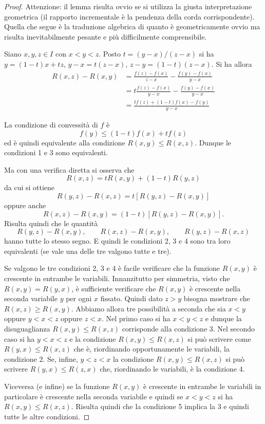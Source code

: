 \begin{proof}
Attenzione:
il lemma risulta ovvio se si utilizza la giusta interpretazione geometrica
(il rapporto incrementale è la pendenza della corda corrispondente).
Quella che segue è la traduzione algebrica di quanto
è geometricamente ovvio ma risulta inevitabilmente pesante
e più difficilmente comprensibile.

Siano $x,y,z\in I$ con $x<y<z$.
Posto $t=(y-x)/(z-x)$ si ha $y=(1-t)x + tz$,
 $y-x = t(z-x)$, $z-y = (1-t)(z-x)$.
Si ha allora
 \begin{equation*}
 \begin{aligned}
 R(x,z) - R(x,y)
 &= \frac{f(z)-f(x)}{z-x} - \frac{f(y)-f(x)}{y-x} \\
  &= t\frac{f(z)-f(x)}{y-x} - \frac{f(y)-f(x)}{y-x} \\
  &= \frac{tf(z) + (1-t) f(x) - f(y)}{y-x}
 \end{aligned}
 \end{equation*}

La condizione di convessità di $f$ è
\[
  f(y) \le (1-t)f(x) + tf(z)
\]
ed è quindi equivalente alla condizione $R(x,y) \le R(x,z)$.
Dunque le condizioni 1 e 3 sono equivalenti.

Ma con una verifica diretta si osserva che
\[
  R(x,z) = t R(x,y) + (1-t) R(y,z)
\]
da cui si ottiene
\[
  R(y,z) - R(x,z) = t[R(y,z) - R(x,y)]
\]
oppure anche
\[
 R(x,z) - R(x,y) = (1-t) [R(y,z) - R(x,y)].
\]
Risulta quindi che le quantità
\[
  R(y,z) - R(x,y), \qquad
  R(x,z) - R(x,y), \qquad
  R(y,z) - R(x,z)
\]
hanno tutte lo stesso segno. E quindi le condizioni 2, 3 e 4 sono tra loro equivalenti (se vale una delle tre valgono tutte e tre).

Se valgono le tre condizioni 2, 3 e 4 è facile verificare che la funzione $R(x,y)$ è crescente in entrambe le variabili. Innanzitutto per simmetria, visto che $R(x,y) = R(y,x)$, è sufficiente verificare che $R(x,y)$ è crescente nella seconda variabile $y$ per ogni $x$ fissato. Quindi dato $z>y$ bisogna mostrare che $R(x,z) \ge R(x,y)$.
Abbiamo allora tre possibilità a seconda che sia $x<y$ oppure $y<x<z$ oppure $z<x$. Nel primo caso si ha $x<y<z$ e dunque la disuguaglianza $R(x,y) \le R(x,z)$ corrisponde alla condizione 3.
Nel secondo caso si ha $y<x<z$ e la condizione $R(x,y)\le R(x,z)$ si può scrivere come $R(y,x) \le R(x,z)$ che è, riordinando opportunamente le variabili, la condizione 2. Se, infine, $y < z < x$ la condizione $R(x,y) \le R(x,z)$ si può scrivere $R(y,x) \le R(z,x)$ che, riordinando le variabili, è la condizione 4.

Viceversa (e infine) se la funzione $R(x,y)$ è crescente in entrambe le variabili in particolare è crescente nella seconda variabile e quindi se $x<y<z$ si ha $R(x,y) \le R(x,z)$. Risulta quindi che la condizione 5 implica la 3 e quindi tutte le altre condizioni.
\end{proof}

